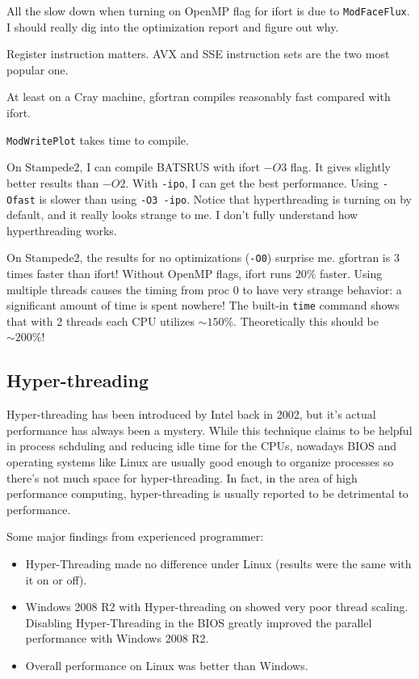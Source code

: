 \documentclass[11pt]{book} %
\begin{document}
All the slow down when turning on OpenMP flag for ifort is due to \verb|ModFaceFlux|. I should really dig into the optimization report and figure out why.

Register instruction matters. AVX and SSE instruction sets are the two most popular one.

At least on a Cray machine, gfortran compiles reasonably fast compared with ifort.

\verb|ModWritePlot| takes time to compile.

On Stampede2, I can compile BATSRUS with ifort $-O3$ flag. It gives slightly better results than $-O2$. With \verb|-ipo|, I can get the best performance. Using \verb|-Ofast| is slower than using \verb|-O3 -ipo|. Notice that hyperthreading is turning on by default, and it really looks strange to me. I don't fully understand how hyperthreading works.

On Stampede2, the results for no optimizations (\verb|-O0|) surprise me. gfortran is 3 times faster than ifort! Without OpenMP flags, ifort runs $20\%$ faster. Using multiple threads causes the timing from proc 0 to have very strange behavior: a significant amount of time is spent nowhere! The built-in \verb|time| command shows that with 2 threads each CPU utilizes $\sim 150\%$. Theoretically this should be $\sim 200\%$!

\subsection{Hyper-threading}

Hyper-threading has been introduced by Intel back in 2002, but it's actual performance has always been a mystery. While this technique claims to be helpful in process schduling and reducing idle time for the CPUs, nowadays BIOS and operating systems like Linux are usually good enough to organize processes so there's not much space for hyper-threading. In fact, in the area of high performance computing, hyper-threading is usually reported to be detrimental to  performance.

Some major findings from experienced programmer:
\begin{itemize}
\item Hyper-Threading made no difference under Linux (results were the same with it on or off).
\item Windows 2008 R2 with Hyper-threading on showed very poor thread scaling. Disabling Hyper-Threading in the BIOS greatly improved the parallel performance with Windows 2008 R2.
\item Overall performance on Linux was better than Windows.
\end{itemize}
\end{document}
